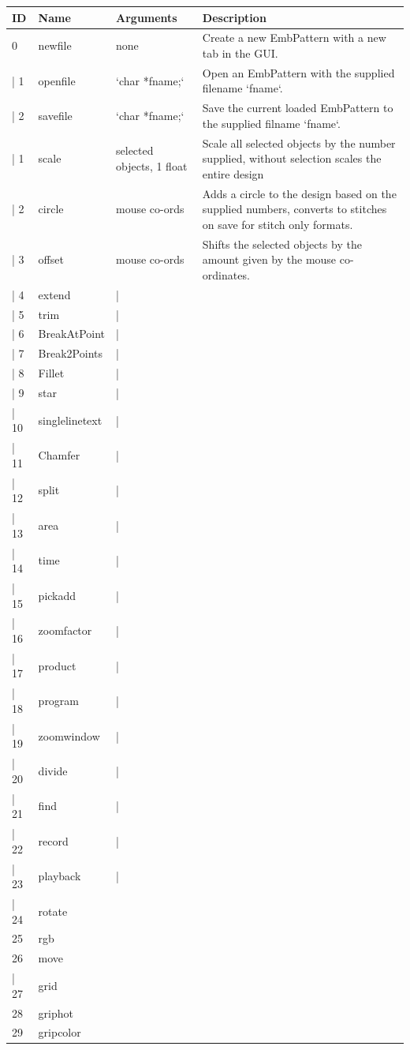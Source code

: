 \documentclass[a4paper, 11pt]{report}
\begin{document}
\begin{tabular}{l l l l}
ID & Name & Arguments & Description \\
\hline
0 & newfile & none & Create a new EmbPattern with a new tab in the GUI. \\
| 1 & openfile & `char *fname;` & Open an EmbPattern with the supplied filename `fname`. \\
| 2 & savefile & `char *fname;` & Save the current loaded EmbPattern to the supplied filname `fname`. \\
| 1 & scale & selected objects, 1 float & Scale all selected objects by the number supplied, without selection scales the entire design \\
| 2 & circle & mouse co-ords & Adds a circle to the design based on the supplied numbers, converts to stitches on save for stitch only formats. \\
| 3 & offset & mouse co-ords & Shifts the selected objects by the amount given by the mouse co-ordinates. \\
| 4 & extend & | \\
| 5 & trim & | \\
| 6 & BreakAtPoint & | \\
| 7 & Break2Points & | \\
| 8 & Fillet & | \\
| 9 & star & | \\
| 10 & singlelinetext & | \\
| 11 & Chamfer & | \\
| 12 & split & | \\
| 13 & area & | \\
| 14 & time & | \\
| 15 & pickadd & | \\
| 16 & zoomfactor & | \\
| 17 & product & | \\
| 18 & program & | \\
| 19 & zoomwindow & | \\
| 20 & divide & | \\
| 21 & find & | \\
| 22 & record & | \\
| 23 & playback & | \\
| 24 & rotate & & \\
25 & rgb & & \\
26 & move & & \\
| 27 & grid & & \\
28 & griphot &  & \\
29 & gripcolor & & \\

\end{tabular}
\end{document}
